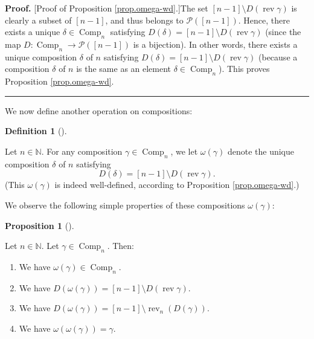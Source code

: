\documentclass[numbers=enddot,12pt,final,onecolumn,notitlepage]{scrartcl}%
\theoremstyle{definition}
\newtheorem{prop}[theo]{Proposition}
\newenvironment{proposition}[1][]
{\begin{prop}[#1]\begin{leftbar}}
{\end{leftbar}\end{prop}}
\newtheorem{defi}[theo]{Definition}
\newenvironment{definition}[1][]
{\begin{defi}[#1]\begin{leftbar}}
{\end{leftbar}\end{defi}}
\newenvironment{proof}[1][Proof]{\noindent\textbf{#1.} }{\ \rule{0.5em}{0.5em}}
\begin{document}
\begin{proof}
[Proof of Proposition \ref{prop.omega-wd}.]The set $\left[  n-1\right]
\setminus D\left(  \operatorname*{rev}\gamma\right)  $ is clearly a subset of
$\left[  n-1\right]  $, and thus belongs to $\mathcal{P}\left(  \left[
n-1\right]  \right)  $. Hence, there exists a unique $\delta\in
\operatorname*{Comp}\nolimits_{n}$ satisfying $D\left(  \delta\right)
=\left[  n-1\right]  \setminus D\left(  \operatorname*{rev}\gamma\right)  $
(since the map $D:\operatorname*{Comp}\nolimits_{n}\rightarrow\mathcal{P}%
\left(  \left[  n-1\right]  \right)  $ is a bijection). In other words, there
exists a unique composition $\delta$ of $n$ satisfying $D\left(
\delta\right)  =\left[  n-1\right]  \setminus D\left(  \operatorname*{rev}%
\gamma\right)  $ (because a composition $\delta$ of $n$ is the same as an
element $\delta\in\operatorname*{Comp}\nolimits_{n}$). This proves Proposition
\ref{prop.omega-wd}.
\end{proof}

We now define another operation on compositions:

\begin{definition}
\label{def.omega-on-comps}Let $n\in\mathbb{N}$. For any composition $\gamma
\in\operatorname*{Comp}\nolimits_{n}$, we let $\omega\left(  \gamma\right)  $
denote the unique composition $\delta$ of $n$ satisfying%
\[
D\left(  \delta\right)  =\left[  n-1\right]  \setminus D\left(
\operatorname*{rev}\gamma\right)  .
\]
(This $\omega\left(  \gamma\right)  $ is indeed well-defined, according to
Proposition \ref{prop.omega-wd}.)
\end{definition}

We observe the following simple properties of these compositions
$\omega\left(  \gamma\right)  $:

\begin{proposition}
\label{prop.omega-invol}Let $n\in\mathbb{N}$. Let $\gamma\in
\operatorname*{Comp}\nolimits_{n}$. Then:

\begin{enumerate}
\item[\textbf{(a)}] We have $\omega\left(  \gamma\right)  \in
\operatorname*{Comp}\nolimits_{n}$.

\item[\textbf{(b)}] We have $D\left(  \omega\left(  \gamma\right)  \right)
=\left[  n-1\right]  \setminus D\left(  \operatorname*{rev}\gamma\right)  $.

\item[\textbf{(c)}] We have $D\left(  \omega\left(  \gamma\right)  \right)
=\left[  n-1\right]  \setminus\operatorname*{rev}\nolimits_{n}\left(  D\left(
\gamma\right)  \right)  $.

\item[\textbf{(d)}] We have $\omega\left(  \omega\left(  \gamma\right)
\right)  =\gamma$.
\end{enumerate}
\end{proposition}
\end{document}
